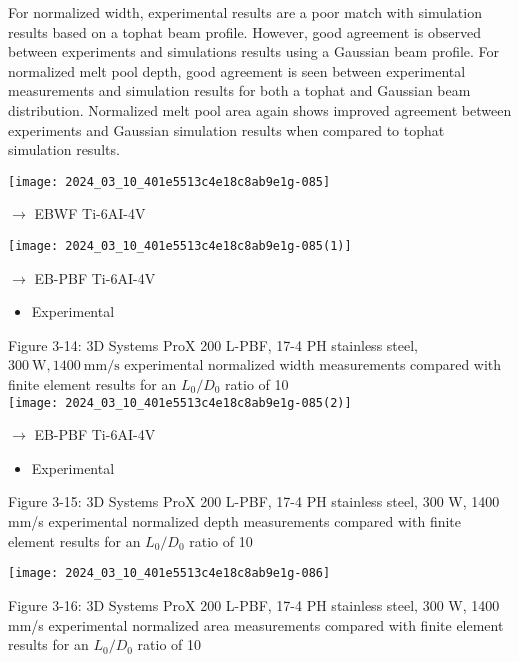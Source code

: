 \documentclass[10pt]{article}
\begin{document}
For normalized width, experimental results are a poor match with simulation results based on a tophat beam profile. However, good agreement is observed between experiments and simulations results using a Gaussian beam profile. For normalized melt pool depth, good agreement is seen between experimental measurements and simulation results for both a tophat and Gaussian beam distribution. Normalized melt pool area again shows improved agreement between experiments and Gaussian simulation results when compared to tophat simulation results.

\begin{center}
\texttt{[image: 2024\_03\_10\_401e5513c4e18c8ab9e1g-085]}
\end{center}

$\longrightarrow$ EBWF Ti-6AI-4V

\begin{center}
\texttt{[image: 2024\_03\_10\_401e5513c4e18c8ab9e1g-085(1)]}
\end{center}

$\longrightarrow$ EB-PBF Ti-6AI-4V

\begin{itemize}
  \item Experimental
\end{itemize}

Figure 3-14: 3D Systems ProX 200 L-PBF, 17-4 PH stainless steel, $300 \mathrm{~W}, 1400 \mathrm{~mm} / \mathrm{s}$ experimental normalized width measurements compared with finite element results for an $L_{0} / D_{0}$ ratio of 10\\
\texttt{[image: 2024\_03\_10\_401e5513c4e18c8ab9e1g-085(2)]}

$\longrightarrow$ EB-PBF Ti-6AI-4V

\begin{itemize}
  \item Experimental
\end{itemize}

Figure 3-15: 3D Systems ProX 200 L-PBF, 17-4 PH stainless steel, 300 W, 1400 mm/s experimental normalized depth measurements compared with finite element results for an $L_{0} / D_{0}$ ratio of 10

\begin{center}
\texttt{[image: 2024\_03\_10\_401e5513c4e18c8ab9e1g-086]}
\end{center}

Figure 3-16: 3D Systems ProX 200 L-PBF, 17-4 PH stainless steel, 300 W, 1400 mm/s experimental normalized area measurements compared with finite element results for an $L_{0} / D_{0}$ ratio of 10
\end{document}
